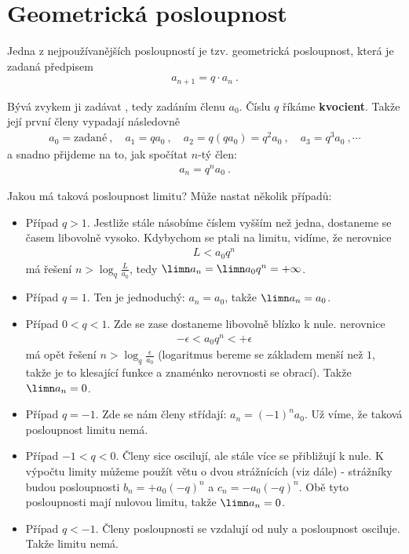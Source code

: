 \section*{Geometrická posloupnost}

Jedna z nejpoužívanějších posloupností je tzv. geometrická posloupnost, která je zadaná předpisem \begin{align}
    a_{n+1} = q \cdot a_n \:.
\end{align}

Bývá zvykem ji zadávat , tedy zadáním členu $a_0$. Číslu $q$ říkáme \textbf{kvocient}. Takže její první členy vypadají následovně
\begin{align}
    a_0 = \textrm{zadané} \:, \quad
    a_1 = q a_0 \:, \quad
    a_2 = q (q a_0) = q^2 a_0 \:, \quad
    a_3 = q^3 a_0 \:,
    \cdots
\end{align}
a snadno přijdeme na to, jak spočítat $n$-tý člen:
\begin{align}
    a_n = q^n a_0 \:.
\end{align}

Jakou má taková posloupnost limitu? Může nastat několik případů:
\begin{itemize}
    \item Případ $q>1$. Jestliže stále násobíme číslem vyšším než jedna, dostaneme se časem libovolně vysoko. Kdybychom se ptali na limitu, vidíme, že nerovnice
    \begin{align}
        L < a_0 q^n
    \end{align}
    má řešení $n > \log_q \frac{L}{a_0}$, tedy $\limn a_n = \limn a_0 q^n = +\infty$.

    \item Případ $q=1$. Ten je jednoduchý: $a_n = a_0$, takže $\limn a_n = a_0$.
    
    \item Případ $0<q<1$. Zde se zase dostaneme libovolně blízko k nule. nerovnice
    \begin{align}
        -\epsilon < a_0 q^n < + \epsilon
    \end{align}
    má opět řešení $n > \log_q \frac{\epsilon}{a_0}$ (logaritmus bereme se základem menší než $1$, takže je to klesající funkce a znaménko nerovnosti se obrací). Takže $\limn a_n = 0$.

    \item Případ $q=-1$. Zde se nám členy střídají: $a_n = (-1)^n a_0$. Už víme, že taková posloupnost limitu nemá.
    
    \item Případ $-1<q<0$. Členy sice oscilují, ale stále více se přibližují k nule. K výpočtu limity můžeme použít větu o dvou strážnících (viz dále) - strážníky budou posloupnosti $b_n = + a_0 (-q)^n$ a $c_n = -a_0 (-q)^n$. Obě tyto posloupnosti mají nulovou limitu, takže $\limn a_n = 0 $.

    \item Případ $q < -1$. Členy posloupnosti se vzdalují od nuly a posloupnost osciluje. Takže limitu nemá.
\end{itemize}

